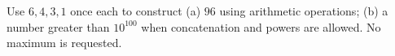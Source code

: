 Use $6,4,3,1$ once each to construct (a) $96$ using arithmetic operations; (b) a number greater than $10^{100}$ when concatenation and powers are allowed. No maximum is requested.
